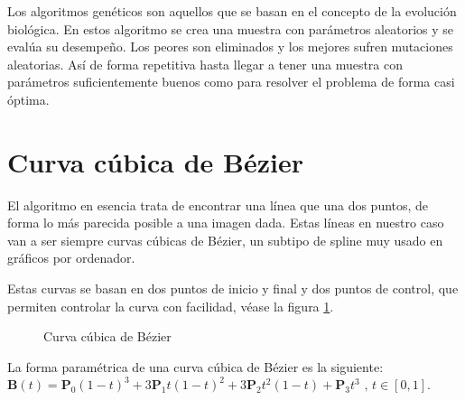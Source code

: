 \documentclass{report}
\begin{document}
Los algoritmos genéticos son aquellos que se basan en el concepto de la evolución biológica.
En estos algoritmo se crea una muestra con parámetros aleatorios y se evalúa su desempeño.
Los peores son eliminados y los mejores sufren mutaciones aleatorias. Así de forma repetitiva hasta
llegar a tener una muestra con parámetros suficientemente buenos como para resolver el problema de 
forma casi óptima.

\section{Curva cúbica de Bézier}

El algoritmo en esencia trata de encontrar una línea que una dos puntos, de forma lo más parecida
posible a una imagen dada. Estas líneas en nuestro caso van a ser siempre curvas cúbicas de Bézier,
un subtipo de spline muy usado en gráficos por ordenador.

Estas curvas se basan en dos puntos de inicio y final y dos puntos de control, que permiten controlar
la curva con facilidad, véase la figura \ref{fig:bezier}.

\begin{figure}
	\caption{\label{fig:bezier} Curva cúbica de Bézier}
\end{figure}

La forma paramétrica de una curva cúbica de Bézier es la siguiente:  \\

\begin{math}
	\mathbf{B}(t)=\mathbf{P}_0(1-t)^3+3\mathbf{P}_1t(1-t)^2+3\mathbf{P}_2t^2(1-t)+\mathbf{P}_3t^3 \mbox{ , } t \in [0,1].
\end{math}
\end{document}
